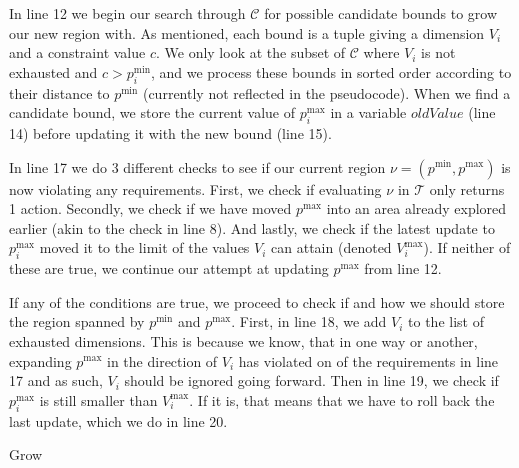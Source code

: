 In line 12 we begin our search through $\mathcal{C}$ for possible candidate
bounds to grow our new region with. As mentioned, each bound is a tuple giving a
dimension $V_i$ and a constraint value $c$. We only look at the subset of
$\mathcal{C}$ where $V_i$ is not exhausted and $c > p^{\min}_i$, and we process
these bounds in sorted order according to their distance to $p^{\min}$
(currently not reflected in the pseudocode). When we find a candidate bound, we
store the current value of $p^{\max}_i$ in a variable $oldValue$ (line 14)
before updating it with the new bound (line 15).

In line 17 we do 3 different checks to see if our current region $\nu =
(p^{\min}, p^{\max})$ is now violating any requirements. First, we check if
evaluating $\nu$ in $\mathcal{T}$ only returns 1 action.  Secondly, we check if
we have moved $p^{\max}$ into an area already explored earlier (akin to the
check in line 8). And lastly, we check if the latest update to $p^{\max}_i$
moved it to the limit of the values $V_i$ can attain (denoted $V^{\max}_i$). If
neither of these are true, we continue our attempt at updating $p^{\max}$ from
line 12.

If any of the conditions are true, we proceed to check if and how we should
store the region spanned by $p^{\min}$ and $p^{\max}$. First, in line 18, we add
$V_i$ to the list of exhausted dimensions. This is because we know, that in one
way or another, expanding $p^{\max}$ in the direction of $V_i$ has violated on
of the requirements in line 17 and as such, $V_i$ should be ignored going
forward. Then in line 19, we check if $p^{\max}_i$ is still smaller than
$V^{\max}_i$. If it is, that means that we have to roll back the last update,
which we do in line 20.

\begin{algorithm}[!ht]
    \caption{Grow}\label{alg:Grow}

    \begin{algorithmic}[1]


            \Else%
            \EndIf%
        \EndFunction
    \end{algorithmic}

\end{algorithm}

